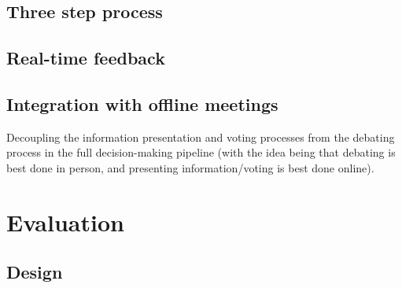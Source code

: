 \documentclass{sigchi}
\begin{document}
\subsection{Three step process}

\subsection{Real-time feedback}



\subsection{Integration with offline meetings}

Decoupling the information presentation and voting processes from the debating process in the full decision-making
pipeline (with the idea being that debating is best done in person, and presenting information/voting is best done online).

\section{Evaluation}

\subsection{Design}
\end{document}
